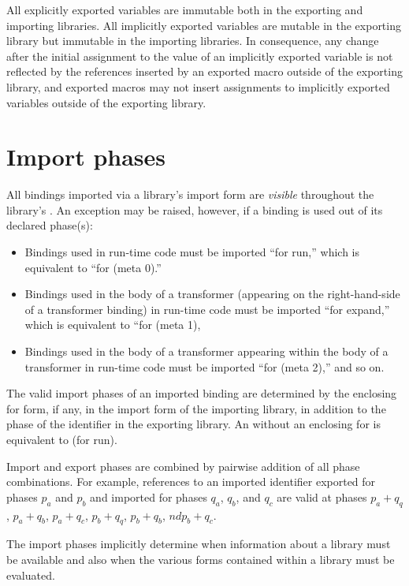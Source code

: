 \label{importsareimmutablesection} 
All explicitly exported variables are immutable both in the exporting and
importing libraries.
All implicitly exported variables are mutable in the exporting library but
immutable in the importing libraries.
In consequence, any change after the initial assignment to the value of an
implicitly exported variable is not reflected by the references inserted
by an exported macro outside of the exporting library, and exported macros
may not insert assignments to implicitly exported variables outside of the
exporting library.

\section{Import phases}
\label{phasessection}

All bindings imported via a library's {\cf import} form are
\emph{visible} throughout the library's .
An exception may be raised, however, if a binding is used out of its declared
phase(s):

\begin{itemize}
\item Bindings used in run-time code must be imported ``for {\cf run},''
which is equivalent to ``for {\cf (meta 0)}.''
\item Bindings used in the body of a transformer (appearing on the
right-hand-side of a transformer binding) in run-time code must be
imported ``for {\cf expand},'' which is equivalent to
``for {\cf (meta 1)},
\item Bindings used in the body of a transformer appearing within the body of a
transformer in run-time code must be imported ``for {\cf (meta 2)},''
and so on.
\end{itemize}

The valid import phases of an imported binding are determined by the enclosing
{\cf for} form, if any, in the {\cf import} form of the importing
library, in addition to the phase of the identifier in the exporting library.
An  without an enclosing {\cf for} is equivalent to
{\cf (for  run)}.

Import and export phases are combined by pairwise addition of all phase
combinations.  For example, references to an imported identifier exported
for phases $p_a$ and $p_b$ and imported for phases $q_a$, $q_b$, and $q_c$
are valid at phases $p_a+q_q$, $p_a+q_b$, $p_a+q_c$, $p_b+q_q$, $p_b+q_b$,
$nd p_b+q_c$.

The import phases implicitly determine when information about a
library must be available and also when the various forms contained within
a library must be evaluated.

